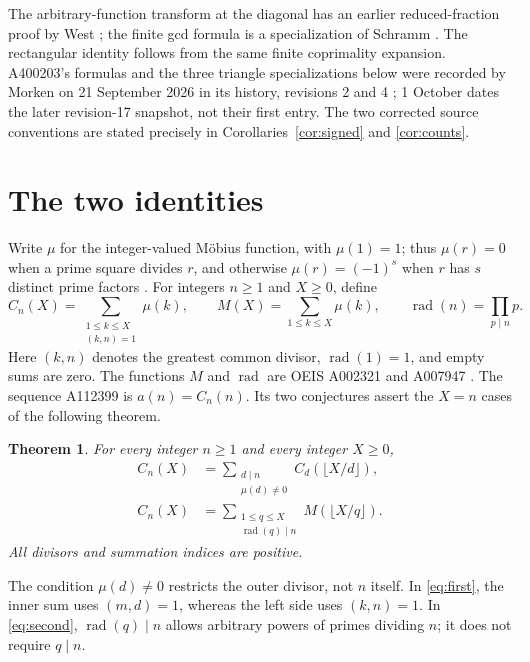 \documentclass[11pt]{article}
\newtheorem{theorem}{Theorem}
\newcommand{\mob}{\mu}
\newcommand{\rad}{\operatorname{rad}}
\newcommand{\C}{C}
\begin{document}
The arbitrary-function transform at the diagonal has an earlier
reduced-fraction proof by West \cite{west}; the finite gcd formula is
a specialization of Schramm \cite[theorem (i), (2), and Example 5]{schramm}.
The rectangular identity follows from the same finite coprimality
expansion. A400203's formulas and the three triangle specializations
below were recorded by Morken on 21 September 2026 in its history,
revisions 2 and 4 \cite{a400203}; 1 October dates the later revision-17
snapshot, not their first entry. The two corrected source conventions
are stated precisely in Corollaries~\ref{cor:signed} and \ref{cor:counts}.

\section{The two identities}
Write $\mob$ for the integer-valued M\"obius function, with $\mob(1)=1$;
thus $\mob(r)=0$ when a prime square divides $r$, and otherwise
$\mob(r)=(-1)^s$ when $r$ has $s$ distinct prime factors \cite{a008683}.
For integers $n\geq1$ and $X\geq0$, define
\[
 \C_n(X)=\sum_{\substack{1\leq k\leq X\\(k,n)=1}}\mob(k),
 \qquad M(X)=\sum_{1\leq k\leq X}\mob(k),
 \qquad \rad(n)=\prod_{p\mid n}p.
\]
Here $(k,n)$ denotes the greatest common divisor, $\rad(1)=1$, and empty
sums are zero. The functions $M$ and $\rad$ are OEIS A002321 and A007947
\cite{a002321,a007947}. The sequence A112399 is $a(n)=\C_n(n)$.
Its two conjectures assert the $X=n$ cases of the following theorem.

\begin{theorem}\label{thm:main}
For every integer $n\geq1$ and every integer $X\geq0$,
\begin{align}
 \C_n(X)
 &=\sum_{\substack{d\mid n\\\mob(d)\ne0}}
       \C_d(\lfloor X/d\rfloor),\label{eq:first}\\
 \C_n(X)
 &=\sum_{\substack{1\leq q\leq X\\\rad(q)\mid n}}
       M(\lfloor X/q\rfloor).\label{eq:second}
\end{align}
All divisors and summation indices are positive.
\end{theorem}

The condition $\mob(d)\ne0$ restricts the outer divisor, not $n$ itself.
In \eqref{eq:first}, the inner sum uses $(m,d)=1$, whereas the left side
uses $(k,n)=1$. In \eqref{eq:second}, $\rad(q)\mid n$ allows arbitrary
powers of primes dividing $n$; it does not require $q\mid n$.
\end{document}

